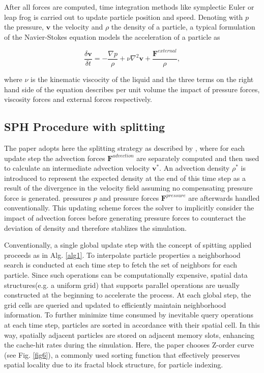 \documentclass[
	11pt, 
	DIV10,
	ngerman,
	a4paper, 
	oneside, 
	headings=normal, 
	captions=tableheading,
	final, 
	numbers=noenddot
]{scrartcl}
\begin{document}
After all forces are computed, time integration methods like symplectic Euler or leap frog is carried out to update particle position and speed. Denoting with $p$ the pressure, $\boldsymbol{v}$ the velocity and $\rho$ the density of a particle, a typical formulation of the Navier-Stokes equation models the acceleration of a particle as

\begin{equation}
	\label{eq1}
	\frac{\delta \boldsymbol{v}}{\delta t} = -\frac{\nabla p}{\rho} + \nu \nabla^{2} \boldsymbol{v} + \frac{\boldsymbol{F}^{external}}{\rho},
\end{equation}

where $ \nu $ is the kinematic viscocity of the liquid and the three terms on the right hand side of the equation describes per unit volume the impact of pressure forces, viscosity forces and external forces respectively. 

\subsection{SPH Procedure with splitting}

The paper adopts here the splitting strategy as described by \cite{ihmsen2014sph}, where for each update step the advection forces $ \boldsymbol{F}^{advection} $ are separately computed and then used to calculate an intermediate advection velocity $ \boldsymbol{v}^{*} $. An advection density $ \rho^{*} $ is introduced to represent the expected density at the end of this time step as a result of the divergence in the velocity field assuming no compensating pressure force is generated. pressures $ p $ and pressure forces $ \boldsymbol{F}^{pressure} $ are afterwards handled conventionally. This updating scheme forces the solver to implicitly consider the impact of advection forces before generating pressure forces to counteract the deviation of density and therefore stablizes the simulation.
\par
Conventionally, a single global update step with the concept of spitting applied proceeds as in Alg. \ref{alg1}. To interpolate particle properties a neighborhood search is conducted at each time step to fetch the set of neighbors for each particle. Since such operations can be computationally expensive, spatial data
structures(e.g. a uniform grid) that supports parallel operations are usually constructed at the beginning to accelerate the process. At each global step, the grid cells are queried and updated to efficiently maintain neighborhood information. To further minimize time consumed by inevitable query operations at each time step, particles are sorted in accordance with their spatial cell. In this way, spatially adjacent particles are stored on adjacent memory slots, enhancing the cache-hit rates during the simulation. Here, the paper chooses Z-order curve (see Fig. \ref{fig6}), a commonly used sorting function that effectively preserves spatial locality due to its fractal block structure, for particle indexing.
\end{document}
